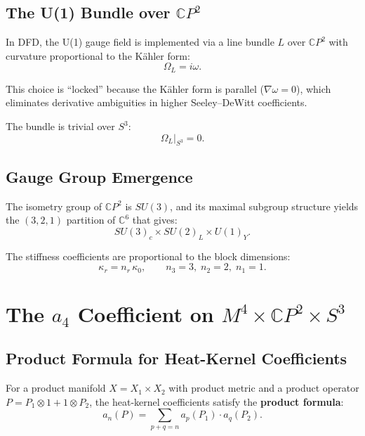 \documentclass[12pt,a4paper]{article}
\begin{document}
\subsection{The U(1) Bundle over $\mathbb{C}P^2$}

In DFD, the U(1) gauge field is implemented via a line bundle $L$ over
$\mathbb{C}P^2$ with curvature proportional to the K\"ahler form:
\begin{equation}\label{eq:u1-curvature}
\Omega_{L} = i\omega.
\end{equation}

This choice is ``locked'' because the K\"ahler form is parallel
($\nabla\omega = 0$), which eliminates derivative ambiguities in higher
Seeley--DeWitt coefficients.

The bundle is trivial over $S^3$:
\begin{equation}
\Omega_L\big|_{S^3} = 0.
\end{equation}

\subsection{Gauge Group Emergence}

The isometry group of $\mathbb{C}P^2$ is $SU(3)$, and its maximal subgroup
structure yields the $(3,2,1)$ partition of $\mathbb{C}^6$ that gives:
\begin{equation}
SU(3)_c \times SU(2)_L \times U(1)_Y.
\end{equation}

The stiffness coefficients are proportional to the block dimensions:
\begin{equation}
\kappa_r = n_r\,\kappa_0, \qquad n_3 = 3,\; n_2 = 2,\; n_1 = 1.
\end{equation}

\section{The $a_4$ Coefficient on $M^4 \times \mathbb{C}P^2 \times S^3$}
\label{sec:a4-product}

\subsection{Product Formula for Heat-Kernel Coefficients}

For a product manifold $X = X_1 \times X_2$ with product metric and a product
operator $P = P_1 \otimes 1 + 1 \otimes P_2$, the heat-kernel coefficients
satisfy the \textbf{product formula}:
\begin{equation}\label{eq:product-formula}
a_n(P) = \sum_{p+q=n} a_p(P_1) \cdot a_q(P_2).
\end{equation}
\end{document}
